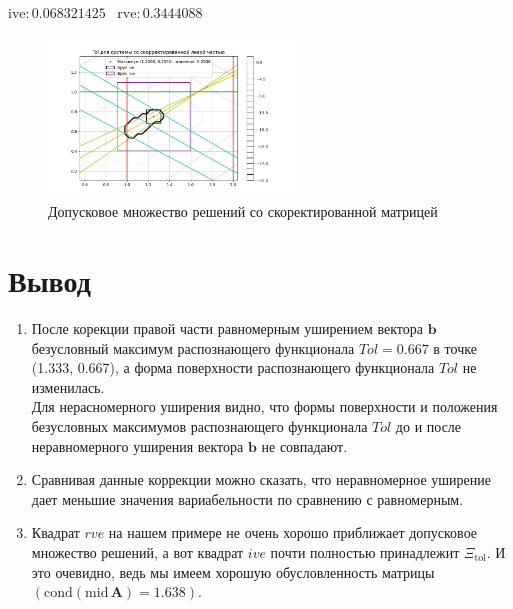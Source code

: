 \documentclass[a4paper,12pt]{article}
\begin{document}
$\mathrm{ive}: 0.068321425 \;\;\;\mathrm{rve}: 0.3444088$
\begin{figure}[H] \label{MatrixCorrSet}
    \centering
    \includegraphics[width=0.6\textwidth]{left_bliz.png}
    \caption{Допусковое множество решений со скоректированной матрицей} 
\end{figure}


\section{Вывод}
\begin{enumerate}
    \item После корекции правой части равномерным уширением вектора $\textbf{b}$ безусловный максимум распознающего функционала $Tol = 0.667$  в точке (1.333, 0.667), а  форма поверхности распознающего функционала $Tol$ не изменилась. \\
    Для нерасномерного уширения видно, что формы поверхности и положения безусловных максимумов распознающего функционала $Tol$ до и после неравномерного уширения вектора $\textbf{b}$ не совпадают. \\
    \item Сравнивая данные коррекции можно сказать, что неравномерное уширение дает меньшие значения вариабельности по сравнению с равномерным.
    \item Квадрат $rve$ на нашем примере не очень хорошо приближает допусковое множество решений, а вот квадрат $ive$ почти полностью принадлежит $\Xi_{\mathrm{tol}}$. И это очевидно, ведь мы имеем хорошую обусловленность матрицы $(\mathrm{cond}(\mathrm{mid}\,\mathbf{A})=1.638)$.
\end{enumerate}
\end{document}
